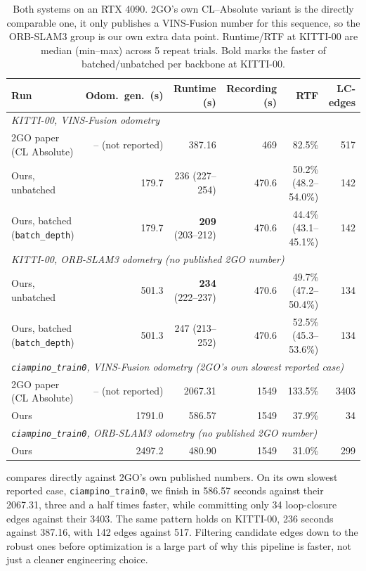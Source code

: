 \begin{table}[htb]
  \centering
  \footnotesize
  \begin{tabular*}{\textwidth}{@{\extracolsep{\fill}} lrrrrr}
  \hline
  \textbf{Run} & \textbf{Odom.\ gen.\ (s)} & \textbf{Runtime (s)} & \textbf{Recording (s)} & \textbf{RTF} & \textbf{LC-edges} \\
  \hline
  \multicolumn{6}{l}{\textit{KITTI-00, VINS-Fusion odometry}} \\
  2GO paper (CL Absolute) & -- (not reported) & 387.16 & 469 & 82.5\% & 517 \\
  Ours, unbatched & 179.7 & 236 (227--254) & 470.6 & 50.2\% (48.2--54.0\%) & 142 \\
  Ours, batched (\texttt{batch\_depth}) & 179.7 & \textbf{209} (203--212) & 470.6 & 44.4\% (43.1--45.1\%) & 142 \\
  \hline
  \multicolumn{6}{l}{\textit{KITTI-00, ORB-SLAM3 odometry (no published 2GO number)}} \\
  Ours, unbatched & 501.3 & \textbf{234} (222--237) & 470.6 & 49.7\% (47.2--50.4\%) & 134 \\
  Ours, batched (\texttt{batch\_depth}) & 501.3 & 247 (213--252) & 470.6 & 52.5\% (45.3--53.6\%) & 134 \\
  \hline
  \multicolumn{6}{l}{\textit{\texttt{ciampino\_train0}, VINS-Fusion odometry (2GO's own slowest reported case)}} \\
  2GO paper (CL Absolute) & -- (not reported) & 2067.31 & 1549 & 133.5\% & 3403 \\
  Ours & 1791.0 & 586.57 & 1549 & 37.9\% & 34 \\
  \hline
  \multicolumn{6}{l}{\textit{\texttt{ciampino\_train0}, ORB-SLAM3 odometry (no published 2GO number)}} \\
  Ours & 2497.2 & 480.90 & 1549 & 31.0\% & 299 \\
  \hline
  \end{tabular*}
  \caption[Isolated-sequence runtime vs.\ 2GO, same GPU model]{Both systems on an RTX 4090. 2GO's
    own CL--Absolute variant is the directly comparable one, it only publishes a VINS-Fusion
    number for this sequence, so the ORB-SLAM3 group is our own extra data point. Runtime/RTF at
    KITTI-00 are median (min--max) across 5 repeat trials. Bold marks the faster of
    batched/unbatched per backbone at KITTI-00.}
  \label{tab:ablation-timing-2go}
\end{table}

 compares directly against 2GO's own published numbers. On its
own slowest reported case, \texttt{ciampino\_train0}, we finish in 586.57 seconds against their
2067.31, three and a half times faster, while committing only 34 loop-closure edges against their
3403. The same pattern holds on KITTI-00, 236 seconds against 387.16, with 142 edges against
517. Filtering candidate edges down to the robust ones before optimization is a large part of why
this pipeline is faster, not just a cleaner engineering choice.

